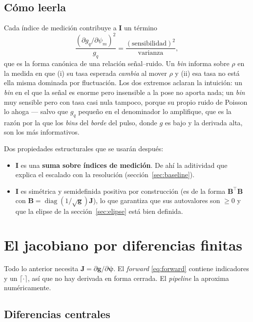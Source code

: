 \documentclass[11pt,a4paper]{article}
\newcommand{\vect}[1]{\boldsymbol{#1}}
\newcommand{\matr}[1]{\mathbf{#1}}
\theoremstyle{definition}
\theoremstyle{plain}
\begin{document}
\subsection{Cómo leerla}

Cada índice de medición contribuye a $\matr I$ un término
%
\[
\frac{(\partial g_q/\partial\psi_m)^2}{g_q}
= \frac{(\text{sensibilidad})^2}{\text{varianza}} ,
\]
%
que es la forma canónica de una relación señal--ruido. Un \emph{bin} informa
sobre $\rho$ en la medida en que (i) su tasa esperada \emph{cambia} al mover
$\rho$ y (ii) esa tasa no está ella misma dominada por fluctuación. Los dos
extremos aclaran la intuición: un \emph{bin} en el que la señal es enorme pero
insensible a la pose no aporta nada; un \emph{bin} muy sensible pero con tasa
casi nula tampoco, porque su propio ruido de Poisson lo ahoga --- salvo que
$g_q$ pequeño en el denominador lo amplifique, que es la razón por la que los
\emph{bins} del \emph{borde} del pulso, donde $g$ es bajo y la derivada alta,
son los más informativos.

Dos propiedades estructurales que se usarán después:
%
\begin{itemize}[leftmargin=*]
  \item $\matr I$ es una \textbf{suma sobre índices de medición}. De ahí la
        aditividad que explica el escalado con la resolución
        (sección~\ref{sec:baseline}).
  \item $\matr I$ es simétrica y semidefinida positiva por construcción
        (es de la forma $\matr B^\top\matr B$ con
        $\matr B=\operatorname{diag}(1/\sqrt{\vect g})\matr J$), lo que garantiza
        que sus autovalores son $\ge0$ y que la elipse de la
        sección~\ref{sec:elipse} está bien definida.
\end{itemize}

\section{El jacobiano por diferencias finitas}
\label{sec:fd}

Todo lo anterior necesita $\matr J=\partial\vect g/\partial\vect\psi$. El
\emph{forward} \eqref{eq:forward} contiene indicadores y un
$\lceil\cdot\rceil$, así que no hay derivada en forma cerrada. El
\emph{pipeline} la aproxima numéricamente.

\subsection{Diferencias centrales}
\end{document}
